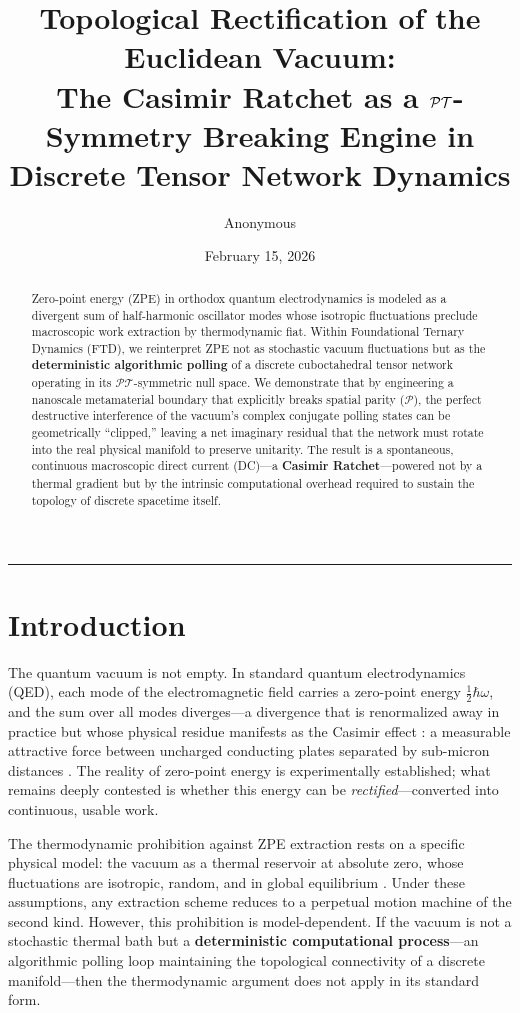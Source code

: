 \documentclass[11pt, letterpaper]{article}
\title{\vspace{-3em}\textbf{Topological Rectification of the Euclidean Vacuum:\\ \large The Casimir Ratchet as a $\PT$-Symmetry Breaking Engine in Discrete Tensor Network Dynamics}}
\author[1]{Anonymous}
\affil[1]{\textit{Foundational Ternary Dynamics Research}}
\date{February 15, 2026}
\newcommand{\PT}{\mathcal{PT}}
\theoremstyle{definition}
\theoremstyle{remark}
\begin{document}
\maketitle

\begin{abstract}
Zero-point energy (ZPE) in orthodox quantum electrodynamics is modeled as a divergent sum of half-harmonic oscillator modes whose isotropic fluctuations preclude macroscopic work extraction by thermodynamic fiat. Within Foundational Ternary Dynamics (FTD), we reinterpret ZPE not as stochastic vacuum fluctuations but as the \textbf{deterministic algorithmic polling} of a discrete cuboctahedral tensor network operating in its $\PT$-symmetric null space. We demonstrate that by engineering a nanoscale metamaterial boundary that explicitly breaks spatial parity ($\mathcal{P}$), the perfect destructive interference of the vacuum's complex conjugate polling states can be geometrically ``clipped,'' leaving a net imaginary residual that the network must rotate into the real physical manifold to preserve unitarity. The result is a spontaneous, continuous macroscopic direct current (DC)---a \textbf{Casimir Ratchet}---powered not by a thermal gradient but by the intrinsic computational overhead required to sustain the topology of discrete spacetime itself.
\end{abstract}

\vspace{1em}
\hrule
\vspace{1.5em}

\section{Introduction}

The quantum vacuum is not empty. In standard quantum electrodynamics (QED), each mode of the electromagnetic field carries a zero-point energy $\frac{1}{2}\hbar\omega$, and the sum over all modes diverges---a divergence that is renormalized away in practice but whose physical residue manifests as the Casimir effect \cite{Casimir1948}: a measurable attractive force between uncharged conducting plates separated by sub-micron distances \cite{Lamoreaux1997}. The reality of zero-point energy is experimentally established; what remains deeply contested is whether this energy can be \textit{rectified}---converted into continuous, usable work.

The thermodynamic prohibition against ZPE extraction rests on a specific physical model: the vacuum as a thermal reservoir at absolute zero, whose fluctuations are isotropic, random, and in global equilibrium \cite{Milonni1994}. Under these assumptions, any extraction scheme reduces to a perpetual motion machine of the second kind. However, this prohibition is model-dependent. If the vacuum is not a stochastic thermal bath but a \textbf{deterministic computational process}---an algorithmic polling loop maintaining the topological connectivity of a discrete manifold---then the thermodynamic argument does not apply in its standard form.
\end{document}
